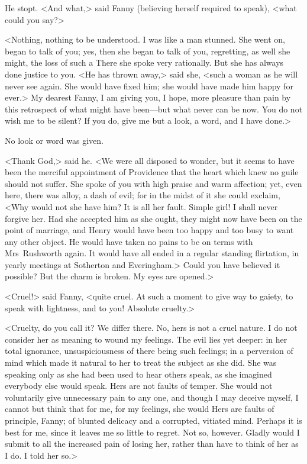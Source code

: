 He stopt. <And what,> said Fanny (believing herself required to speak), <what could you say?>

<Nothing, nothing to be understood. I was like a man stunned. She went on, began to talk of you; yes, then she began to talk of you, regretting, as well she might, the loss of such a There she spoke very rationally. But she has always done justice to you. <He has thrown away,> said she, <such a woman as he will never see again. She would have fixed him; she would have made him happy for ever.> My dearest Fanny, I am giving you, I hope, more pleasure than pain by this retrospect of what might have been—but what never can be now. You do not wish me to be silent? If you do, give me but a look, a word, and I have done.>

No look or word was given.

<Thank God,> said he. <We were all disposed to wonder, but it seems to have been the merciful appointment of Providence that the heart which knew no guile should not suffer. She spoke of you with high praise and warm affection; yet, even here, there was alloy, a dash of evil; for in the midst of it she could exclaim, <Why would not she have him? It is all her fault. Simple girl! I shall never forgive her. Had she accepted him as she ought, they might now have been on the point of marriage, and Henry would have been too happy and too busy to want any other object. He would have taken no pains to be on terms with Mrs~Rushworth again. It would have all ended in a regular standing flirtation, in yearly meetings at Sotherton and Everingham.> Could you have believed it possible? But the charm is broken. My eyes are opened.>

<Cruel!> said Fanny, <quite cruel. At such a moment to give way to gaiety, to speak with lightness, and to you! Absolute cruelty.>

<Cruelty, do you call it? We differ there. No, hers is not a cruel nature. I do not consider her as meaning to wound my feelings. The evil lies yet deeper: in her total ignorance, unsuspiciousness of there being such feelings; in a perversion of mind which made it natural to her to treat the subject as she did. She was speaking only as she had been used to hear others speak, as she imagined everybody else would speak. Hers are not faults of temper. She would not voluntarily give unnecessary pain to any one, and though I may deceive myself, I cannot but think that for me, for my feelings, she would Hers are faults of principle, Fanny; of blunted delicacy and a corrupted, vitiated mind. Perhaps it is best for me, since it leaves me so little to regret. Not so, however. Gladly would I submit to all the increased pain of losing her, rather than have to think of her as I do. I told her so.>

